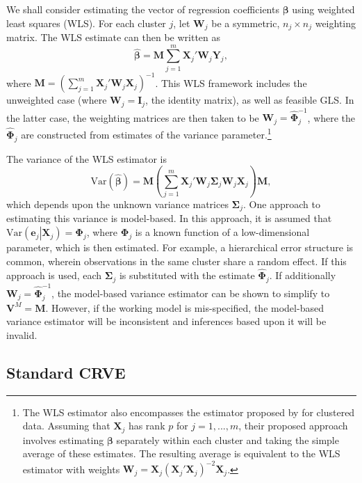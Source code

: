 \documentclass[12pt]{article}
\newcommand{\Var}{\text{Var}}
\newcommand{\bm}{\mathbf}
\newcommand{\bs}{\boldsymbol}
\begin{document}
We shall consider estimating the vector of regression coefficients $\bm\beta$ using weighted least squares (WLS). For each cluster $j$, let $\bm{W}_j$ be a symmetric, $n_j \times n_j$ weighting matrix. The WLS estimate can then be written as
\begin{equation}
\label{eq:WLS}
\bs{\hat\beta} = \bm{M} \sum_{j=1}^m \bm{X}_j' \bm{W}_j \bm{Y}_j, 
\end{equation}
where $\bm{M} = \left(\sum_{j=1}^m \bm{X}_j' \bm{W}_j \bm{X}_j\right)^{-1}$. %
This WLS framework includes the unweighted case (where $\bm{W}_j = \bm{I}_j$, the identity matrix), as well as feasible GLS. In the latter case, the weighting matrices are then taken to be $\bm{W}_j = \hat{\bs\Phi}_j^{-1}$, where the $\hat{\bs\Phi}_j$ are constructed from estimates of the variance parameter.\footnote{
The WLS estimator also encompasses the estimator proposed by \citet{Ibragimov2010tstatistic} for clustered data. 
Assuming that $\bm{X}_j$ has rank $p$ for $j = 1,...,m$, their proposed approach involves estimating $\bs\beta$ separately within each cluster and taking the simple average of these estimates. 
The resulting average is equivalent to the WLS estimator with weights $\bm{W}_j = \bm{X}_j \left(\bm{X}_j'\bm{X}_j\right)^{-2} \bm{X}_j$.}

The variance of the WLS estimator is 
\begin{equation}
\label{eq:var_WLS}
\Var\left(\bs{\hat\beta}\right) = \bm{M}\left(\sum_{j=1}^m \bm{X}_j' \bm{W}_j \bs\Sigma_j \bm{W}_j\bm{X}_j\right) \bm{M},
\end{equation}
which depends upon the unknown variance matrices $\bm\Sigma_j$. 
One approach to estimating this variance is model-based. 
In this approach, it is assumed that $\Var\left(\bm{e}_j\left|\bm{X}_j\right.\right) = \bs\Phi_j$, where $\bs\Phi_j$ is a known function of a low-dimensional parameter, which is then estimated. 
For example, a hierarchical error structure is common, wherein observations in the same cluster share a random effect. 
If this approach is used, each $\bs\Sigma_j$ is substituted with the estimate $\hat{\bs\Phi}_j$. 
If additionally $\bm{W}_j = \hat{\bs\Phi}_j^{-1}$, the model-based variance estimator can be shown to simplify to $\bm{V}^M = \bm{M}$. 
However, if the working model is mis-specified, the model-based variance estimator will be inconsistent and inferences based upon it will be invalid. 

\subsection{Standard CRVE}
\end{document}
